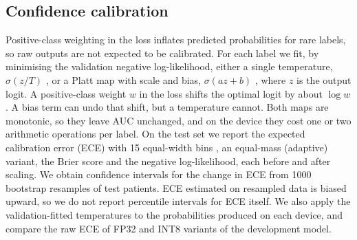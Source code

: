 \documentclass[a4paper,fleqn]{cas-sc}
\begin{document}
\subsection{Confidence calibration}
\label{sec:calib}
Positive-class weighting in the loss inflates predicted probabilities for
rare labels, so raw outputs are not expected to be calibrated. For each
label we fit, by minimising the validation negative log-likelihood, either
a single temperature, $\sigma(z/T)$ \cite{guo2017calibration}, or a Platt
map with scale and bias, $\sigma(az+b)$ \cite{niculescu2005predicting},
where $z$ is the output logit. A positive-class weight $w$ in the loss
shifts the optimal logit by about $\log w$. A bias term can undo that
shift, but a temperature cannot. Both maps are monotonic, so they leave
AUC unchanged, and on the device they cost one or two arithmetic
operations per label. On the test
set we report the expected calibration error (ECE) with 15 equal-width
bins \cite{naeini2015obtaining,guo2017calibration}, an equal-mass
(adaptive) variant, the Brier score and the negative log-likelihood, each
before and after scaling. We obtain confidence intervals for the change in
ECE from 1000 bootstrap resamples of test patients. ECE estimated on
resampled data is biased upward, so we do not report percentile
intervals for ECE itself. We also apply the validation-fitted
temperatures to the probabilities produced on each device, and compare
the raw ECE of FP32 and INT8 variants of the development model.
\end{document}
